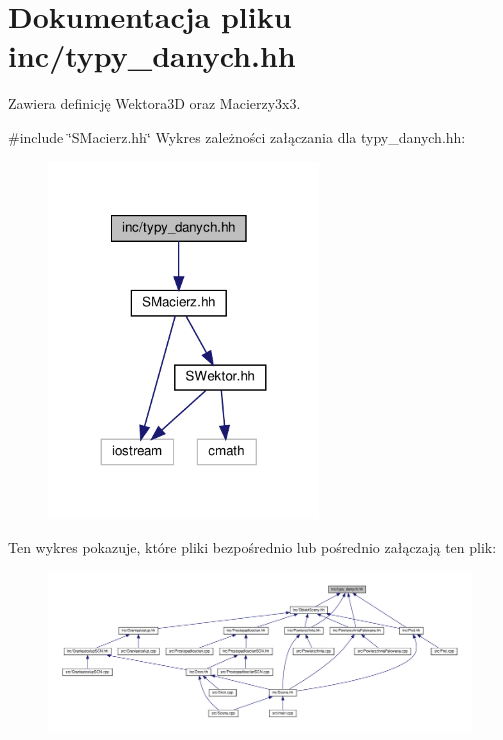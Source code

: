 \hypertarget{typy__danych_8hh}{}\section{Dokumentacja pliku inc/typy\+\_\+danych.hh}
\label{typy__danych_8hh}


Zawiera definicję Wektora3D oraz Macierzy3x3.  


{\ttfamily \#include \char`\"{}S\+Macierz.\+hh\char`\"{}}\newline
Wykres zależności załączania dla typy\+\_\+danych.\+hh\+:\nopagebreak
\begin{figure}[H]
\begin{center}
\leavevmode
\includegraphics[width=203pt]{typy__danych_8hh__incl}
\end{center}
\end{figure}
Ten wykres pokazuje, które pliki bezpośrednio lub pośrednio załączają ten plik\+:\nopagebreak
\begin{figure}[H]
\begin{center}
\leavevmode
\includegraphics[width=350pt]{typy__danych_8hh__dep__incl}
\end{center}
\end{figure}
